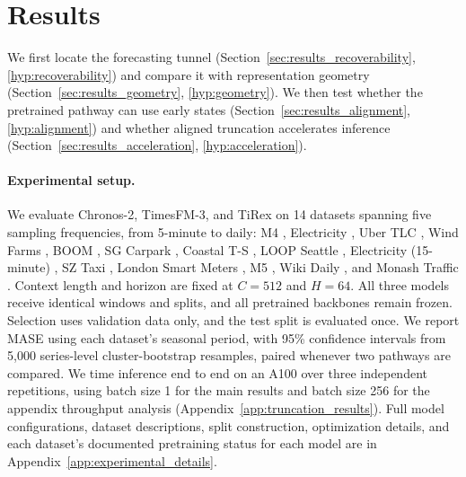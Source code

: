 \documentclass{article} %
\begin{document}
\section{Results}
\label{sec:results}

We first locate the forecasting tunnel (Section~\ref{sec:results_recoverability},
\ref{hyp:recoverability}) and compare it with representation geometry
(Section~\ref{sec:results_geometry}, \ref{hyp:geometry}). We then test whether the pretrained pathway can use early states (Section~\ref{sec:results_alignment}, \ref{hyp:alignment}) and whether aligned truncation accelerates inference (Section~\ref{sec:results_acceleration}, \ref{hyp:acceleration}).

\paragraph{Experimental setup.}
We evaluate Chronos-2, TimesFM-3, and TiRex on 14 datasets spanning five sampling frequencies, from 5-minute to daily: M4 \citep{MAKRIDAKIS202054},
Electricity \citep{electricityloaddiagrams20112014_321, godahewa2021monashtimeseriesforecasting},
Uber TLC \citep{fivethirtyeight_uber_tlc,godahewa2021monashtimeseriesforecasting},
Wind Farms \citep{godahewa2021monashtimeseriesforecasting},
BOOM \citep{cohen2025timedifferentobservabilityperspective},
SG Carpark \citep{qiao2026itstimegenerationtime},
Coastal T-S \citep{qiao2026itstimegenerationtime},
LOOP Seattle \citep{cui2018deep,cui2019traffic},
Electricity (15-minute) \citep{electricityloaddiagrams20112014_321, lai2018modelinglongshorttermtemporal, godahewa2021monashtimeseriesforecasting},
SZ Taxi \citep{jiang2024libcityunifiedlibraryefficient},
London Smart Meters \citep{jeanmidev_smartmeters_london,godahewa2021monashtimeseriesforecasting},
M5 \citep{m5-forecasting-accuracy},
Wiki Daily \citep{ansari2024chronoslearninglanguagetime}, and
Monash Traffic \citep{lai2018modelinglongshorttermtemporal, godahewa2021monashtimeseriesforecasting}. Context length and horizon are fixed at $C=512$ and $H=64$. All three models receive identical windows and splits, and all pretrained backbones remain frozen. Selection uses validation data only, and the test split is evaluated once. We report MASE using each dataset's seasonal period, with 95\% confidence intervals from 5,000 series-level cluster-bootstrap resamples, paired whenever two pathways are compared. We time inference end to end on an A100 over three independent repetitions, using batch size 1 for the main results and batch size 256 for the appendix throughput analysis (Appendix~\ref{app:truncation_results}). Full model configurations, dataset descriptions, split construction, optimization details, and each dataset's documented pretraining status for each model are in Appendix~\ref{app:experimental_details}.
\end{document}
